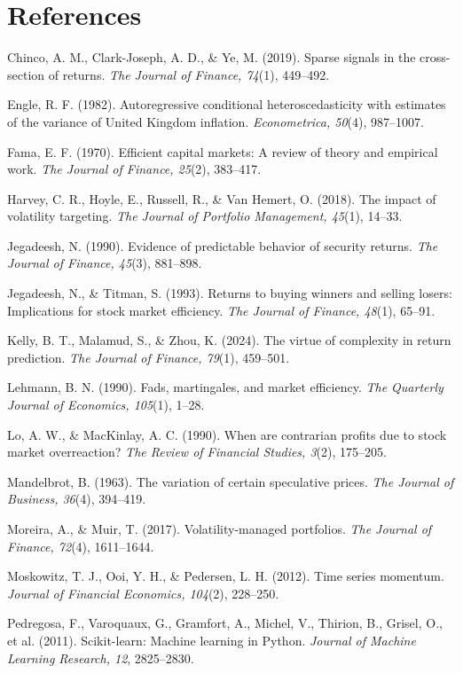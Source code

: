 \documentclass[12pt, a4paper]{article}
\begin{document}
\section{References}
\begin{list}{}{\setlength{\leftmargin}{0.3in}\setlength{\itemindent}{-0.3in}\setlength{\itemsep}{0.2em}\setlength{\parsep}{0em}}
\item Chinco, A. M., Clark-Joseph, A. D., \& Ye, M. (2019). Sparse signals in the cross-section of returns. \textit{The Journal of Finance, 74}(1), 449--492.
\item Engle, R. F. (1982). Autoregressive conditional heteroscedasticity with estimates of the variance of United Kingdom inflation. \textit{Econometrica, 50}(4), 987--1007.
\item Fama, E. F. (1970). Efficient capital markets: A review of theory and empirical work. \textit{The Journal of Finance, 25}(2), 383--417.
\item Harvey, C. R., Hoyle, E., Russell, R., \& Van Hemert, O. (2018). The impact of volatility targeting. \textit{The Journal of Portfolio Management, 45}(1), 14--33.
\item Jegadeesh, N. (1990). Evidence of predictable behavior of security returns. \textit{The Journal of Finance, 45}(3), 881--898.
\item Jegadeesh, N., \& Titman, S. (1993). Returns to buying winners and selling losers: Implications for stock market efficiency. \textit{The Journal of Finance, 48}(1), 65--91.
\item Kelly, B. T., Malamud, S., \& Zhou, K. (2024). The virtue of complexity in return prediction. \textit{The Journal of Finance, 79}(1), 459--501.
\item Lehmann, B. N. (1990). Fads, martingales, and market efficiency. \textit{The Quarterly Journal of Economics, 105}(1), 1--28.
\item Lo, A. W., \& MacKinlay, A. C. (1990). When are contrarian profits due to stock market overreaction? \textit{The Review of Financial Studies, 3}(2), 175--205.
\item Mandelbrot, B. (1963). The variation of certain speculative prices. \textit{The Journal of Business, 36}(4), 394--419.
\item Moreira, A., \& Muir, T. (2017). Volatility-managed portfolios. \textit{The Journal of Finance, 72}(4), 1611--1644.
\item Moskowitz, T. J., Ooi, Y. H., \& Pedersen, L. H. (2012). Time series momentum. \textit{Journal of Financial Economics, 104}(2), 228--250.
\item Pedregosa, F., Varoquaux, G., Gramfort, A., Michel, V., Thirion, B., Grisel, O., et al. (2011). Scikit-learn: Machine learning in Python. \textit{Journal of Machine Learning Research, 12}, 2825--2830.
\end{list}
\end{document}
